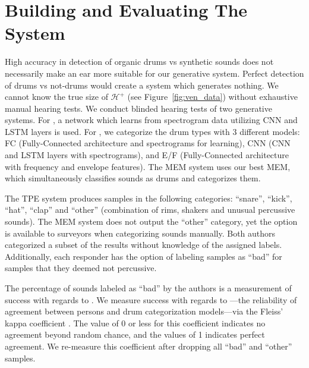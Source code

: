 \documentclass[runningheads,a4paper]{llncs}
\begin{document}
\section{Building and Evaluating The System}

High accuracy in detection of organic drums vs synthetic sounds does not necessarily make an ear more suitable for our generative system. Perfect detection of drums vs not-drums would create a system which generates nothing.  We cannot know the true size of $\mathcal{H^{+}}$ (see Figure~\ref{fig:ven_data}) without exhaustive manual hearing tests. We conduct blinded hearing tests of two generative systems. For \decfirst, a network which learns from spectrogram data utilizing CNN and LSTM layers is used. For \decsecond, we categorize the drum types with 3 different models: FC (Fully-Connected architecture and spectrograms for learning), CNN (CNN and LSTM layers with spectrograms), and E/F (Fully-Connected architecture with frequency and envelope features). The MEM system uses our best MEM, which simultaneously classifies sounds as drums and categorizes them. 

The TPE system produces samples in the following categories: \enquote{snare}, \enquote{kick}, \enquote{hat}, \enquote{clap} and \enquote{other} (combination of rims, shakers and unusual percussive sounds). The MEM system does not output the \enquote{other} category, yet the option is available to surveyors when categorizing sounds manually.   
Both authors categorized a subset of the results without knowledge of the assigned labels. Additionally, each responder has the option of labeling samples as \enquote{bad} for samples that they deemed not percussive. 

The percentage of sounds labeled as \enquote{bad} by the authors is a measurement of success with regards to \decfirst. We measure success with regards to \decsecond---the reliability of agreement between persons and drum categorization models---via the Fleiss' kappa coefficient \cite{fleiss1971measuring}. The value of 0 or less for this coefficient indicates no agreement beyond random chance, and the values of 1 indicates perfect agreement. We re-measure this coefficient after dropping all \enquote{bad} and \enquote{other} samples. 
\end{document}

